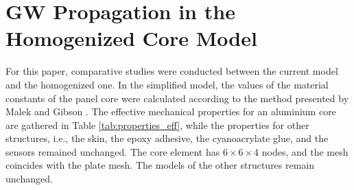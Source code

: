 \section{GW Propagation in the Homogenized Core Model}
\label{sec:homogenized}

For this paper, comparative studies were conducted between the current model and the homogenized one. 
In the simplified model, the values of the material constants of the panel core were calculated according to the method presented by Malek and Gibson \cite{malek2015effective}.
The effective mechanical properties for an aluminium core are gathered in Table \ref{tab:properties_eff}, while the properties for other structures, i.e., the skin, the epoxy adhesive, the cyanoacrylate glue, and the sensors remained unchanged.
The core element has \(6 \times 6 \times 4\) nodes, and the mesh coincides with the plate mesh. The models of the other structures remain unchanged.